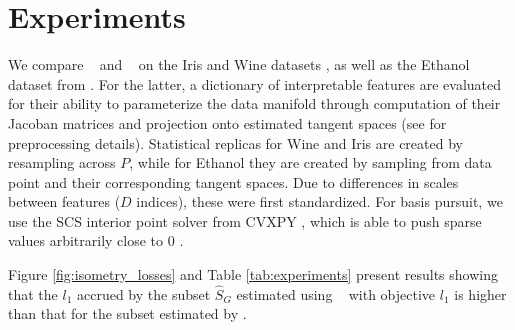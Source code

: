 \section{Experiments}
\label{sec:experiments}

We compare \tsip~ and \greedy~ on the Iris and Wine datasets \citep{misc_iris_53, misc_wine_109, scikit-learn}, as well as the Ethanol dataset from \citet{Chmiela2018-at, Koelle2022-ju}.
For the latter, a dictionary of interpretable features are evaluated for their ability to parameterize the data manifold through computation of their Jacoban matrices and projection onto estimated tangent spaces (see \citet{Koelle2022-ju} for preprocessing details).
Statistical replicas for Wine and Iris are created by resampling across $P$, while for Ethanol they are created by sampling from data point and their corresponding tangent spaces.
Due to differences in scales between features ($D$ indices), these were first standardized.
For basis pursuit, we use the SCS interior point solver \citep{ocpb:16} from CVXPY \citep{diamond2016cvxpy, agrawal2018rewriting}, which is able to push sparse values arbitrarily close to 0 \citep{cvxpy_sparse_solution}.

Figure \ref{fig:isometry_losses} and Table \ref{tab:experiments} present results showing that the $l_1$ accrued by the subset $\widehat S_{G}$ estimated using \greedy~ with objective $l_1$ is higher than that for the subset estimated by \tsip.


